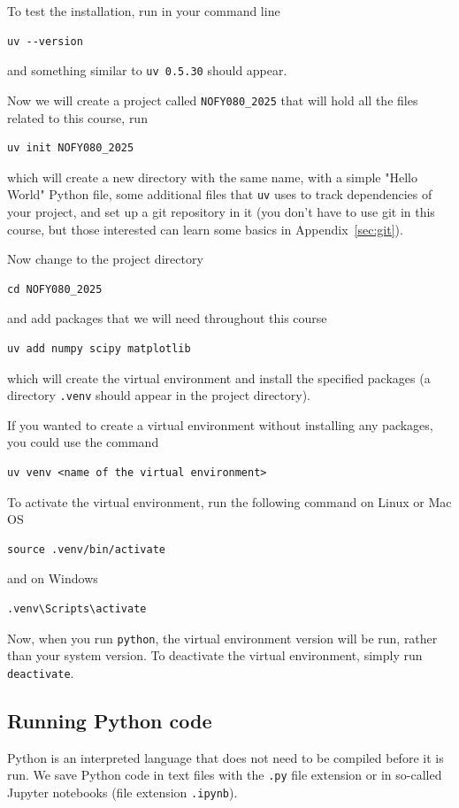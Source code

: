 To test the installation, run in your command line
\begin{lstlisting}
uv --version
\end{lstlisting}
and something similar to \verb|uv 0.5.30| should appear.

Now we will create a project called \verb|NOFY080_2025| that will hold all the files related to this course, run
\begin{lstlisting}
uv init NOFY080_2025
\end{lstlisting}
which will create a new directory with the same name, with a simple "Hello World" Python file, some additional files that \verb|uv| uses to track dependencies of your project, and set up a git repository in it (you don't have to use git in this course, but those interested can learn some basics in Appendix~\ref{sec:git}).

Now change to the project directory
\begin{lstlisting}
cd NOFY080_2025
\end{lstlisting}
and add packages that we will need throughout this course
\begin{lstlisting}
uv add numpy scipy matplotlib
\end{lstlisting}
which will create the virtual environment and install the specified packages (a directory \verb|.venv| should appear in the project directory).

If you wanted to create a virtual environment without installing any packages, you could use the command
\begin{lstlisting}
uv venv <name of the virtual environment>
\end{lstlisting}

To activate the virtual environment, run the following command on Linux or Mac OS
\begin{lstlisting}
source .venv/bin/activate
\end{lstlisting}
and on Windows
\begin{lstlisting}
.venv\Scripts\activate
\end{lstlisting}

Now, when you run \verb|python|, the virtual environment version will be run, rather than your system version. To deactivate the virtual environment, simply run \verb|deactivate|.

\subsection{Running Python code}
Python is an interpreted language that does not need to be compiled before it is run. We save Python code in text files with the \verb|.py| file extension or in so-called Jupyter notebooks (file extension \verb|.ipynb|).

